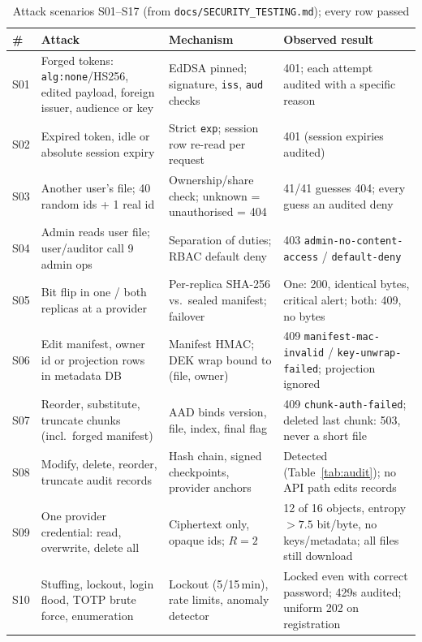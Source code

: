 \documentclass[conference]{IEEEtran}
\newcommand{\code}[1]{\texttt{\small #1}}
\begin{document}
\begin{table}[t]
\caption{Attack scenarios S01--S17 (from \code{docs/SECURITY\_TESTING.md}); every row passed}
\label{tab:attacks}
\centering
\footnotesize
\begin{tabularx}{\textwidth}{@{}P{0.5cm}P{4.1cm}P{5.1cm}L@{}}
\toprule
\# & Attack & Mechanism & Observed result \\
\midrule
S01 & Forged tokens: \code{alg:none}/HS256, edited payload, foreign issuer, audience or key & EdDSA pinned; signature, \code{iss}, \code{aud} checks & 401; each attempt audited with a specific reason \\
S02 & Expired token, idle or absolute session expiry & Strict \code{exp}; session row re-read per request & 401 (session expiries audited) \\
S03 & Another user's file; 40 random ids + 1 real id & Ownership/share check; unknown = unauthorised = 404 & 41/41 guesses 404; every guess an audited deny \\
S04 & Admin reads user file; user/auditor call 9 admin ops & Separation of duties; RBAC default deny & 403 \code{admin-no-content-access} / \code{default-deny} \\
S05 & Bit flip in one / both replicas at a provider & Per-replica SHA-256 vs.\ sealed manifest; failover & One: 200, identical bytes, critical alert; both: 409, no bytes \\
S06 & Edit manifest, owner id or projection rows in metadata DB & Manifest HMAC; DEK wrap bound to (file, owner) & 409 \code{manifest-mac-invalid} / \code{key-unwrap-failed}; projection ignored \\
S07 & Reorder, substitute, truncate chunks (incl.\ forged manifest) & AAD binds version, file, index, final flag & 409 \code{chunk-auth-failed}; deleted last chunk: 503, never a short file \\
S08 & Modify, delete, reorder, truncate audit records & Hash chain, signed checkpoints, provider anchors & Detected (Table~\ref{tab:audit}); no API path edits records \\
S09 & One provider credential: read, overwrite, delete all & Ciphertext only, opaque ids; $R=2$ & 12 of 16 objects, entropy $>7.5$ bit/byte, no keys/metadata; all files still download \\
S10 & Stuffing, lockout, login flood, TOTP brute force, enumeration & Lockout (5/15\,min), rate limits, anomaly detector & Locked even with correct password; 429s audited; uniform 202 on registration \\

\end{tabularx}
\end{table}
\end{document}
